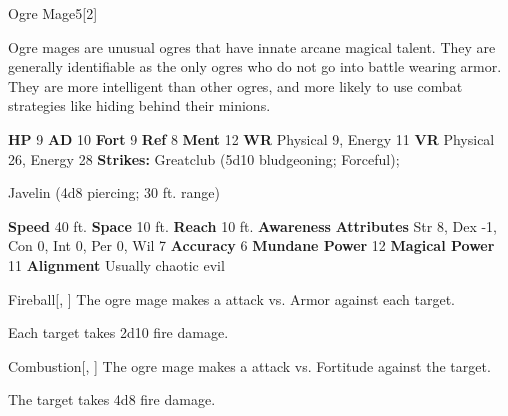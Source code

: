   \begin{monsubsection}{Ogre Mage}{5}[2]
    \vspace{-1em}\vspace{-1em}
    \vspace{0em}

    
          Ogre mages are unusual ogres that have innate arcane magical talent.
          They are generally identifiable as the only ogres who do not go into battle wearing armor.
          They are more intelligent than other ogres, and more likely to use combat strategies like hiding behind their minions.
        

    \begin{spellcontent}
      \begin{spelltargetinginfo}
        \pari \textbf{HP} 9 \monsep
          \textbf{AD} 10 \monsep
          \textbf{Fort} 9 \monsep
          \textbf{Ref} 8 \monsep
          \textbf{Ment} 12
        \pari \textbf{WR} Physical 9, Energy 11 \monsep
        \textbf{VR} Physical 26, Energy 28
        \pari \textbf{Strikes:}
            Greatclub  (5d10 bludgeoning; Forceful);
\par Javelin  (4d8 piercing; 30 ft. range)
      \end{spelltargetinginfo}
    \end{spellcontent}
    \begin{monsterfooter}
      \pari \textbf{Speed} 40 ft. \monsep
        \textbf{Space} 10 ft. \monsep
        \textbf{Reach} 10 ft.
      \pari \textbf{Awareness} 
      \pari \textbf{Attributes}
        Str 8, Dex -1,
        Con 0, Int 0,
        Per 0, Wil 7
      \pari \textbf{Accuracy} 6 \monsep
        \textbf{Mundane Power} 12 \monsep
      \textbf{Magical Power} 11
      \pari \textbf{Alignment} Usually chaotic evil
    \end{monsterfooter}
  \end{monsubsection}
  \begin{freeability}{Fireball}[, ]
       The ogre mage makes a  attack
        vs. Armor against each target.
    
    \hit Each target takes 2d10 fire damage.
    \end{freeability}
  

    \begin{freeability}{Combustion}[, ]
       The ogre mage makes a  attack
        vs. Fortitude against the target.
    
    \hit The target takes 4d8 fire damage.
    \end{freeability}
  

